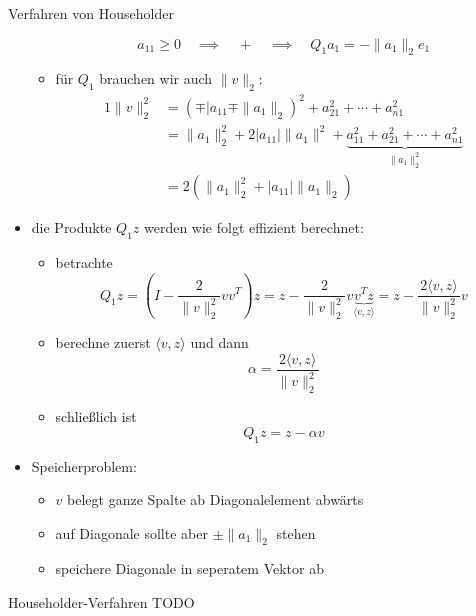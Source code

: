 \begin{defi}{Verfahren von Householder}
\begin{itemize}
\begin{itemize}
\[                        \]
                        \[
                            a_{11} \geq 0 \quad \implies \quad + \quad \implies \quad Q_1a_1 = - \|a_1\|_2 e_1
                        \]
                  \item für $Q_1$ brauchen wir auch $\|v\|_2$:
                        \begin{alignat*}{1}
                            \|v\|_2^2 & = ( \mp | a_{11} \mp \|a_1\|_2 )^2 + a_{21}^2 + \cdots + a_{n1}^2                                         \\ 
                                      & = \|a_1\|_2^2 + 2 |a_{11}| \|a_1\|^2 + \underbrace{a_{11}^2 + a_{21}^2 + \cdots + a_{n1}^2}_{\|a_1\|_2^2} \\ 
                                      & = 2 (\|a_1\|_2^2 + |a_{11}| \|a_1\|_2)
                        \end{alignat*}
              \end{itemize}
        \item die Produkte $Q_1z$ werden wie folgt effizient berechnet:
              \begin{itemize}
                  \item betrachte
                        \[
                            Q_1z = \left( I - \frac{2}{\|v\|_2^2} vv^T \right) z = z - \frac{2}{\|v\|_2^2} v \underbrace{v^Tz}_{\langle v, z \rangle} = z - \frac{2 \langle v, z \rangle}{\|v\|_2^2} v
                        \]
                  \item berechne zuerst $\langle v, z \rangle$ und dann
                        \[ 
                            \alpha = \frac{2 \langle v, z \rangle}{\|v\|_2^2}
                        \]
                  \item schließlich ist
                        \[ 
                            Q_1 z = z - \alpha v
                        \]
              \end{itemize}
        \item Speicherproblem:
              \begin{itemize}
                  \item $v$ belegt ganze Spalte ab Diagonalelement abwärts
                  \item auf Diagonale sollte aber $\pm \|a_1\|_2$ stehen
                  \item speichere Diagonale in seperatem Vektor ab
              \end{itemize}
    \end{itemize}
\end{defi}

\begin{example}{Householder-Verfahren}
    TODO
\end{example}